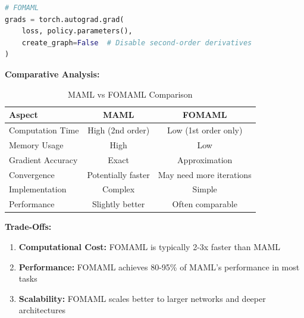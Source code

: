 \documentclass[12pt]{article}
\begin{document}
{{\begin{lstlisting}[language=Python]
# FOMAML
grads = torch.autograd.grad(
    loss, policy.parameters(),
    create_graph=False  # Disable second-order derivatives
)
\end{lstlisting}
			
			\textbf{Comparative Analysis:}
			
			\begin{table}[H]
			\centering
			\caption{MAML vs FOMAML Comparison}
			\begin{tabular}{|l|c|c|}
			\hline
			\textbf{Aspect} & \textbf{MAML} & \textbf{FOMAML} \\
			\hline
			Computation Time & High (2nd order) & Low (1st order only) \\
			\hline
			Memory Usage & High & Low \\
			\hline
			Gradient Accuracy & Exact & Approximation \\
			\hline
			Convergence & Potentially faster & May need more iterations \\
			\hline
			Implementation & Complex & Simple \\
			\hline
			Performance & Slightly better & Often comparable \\
			\hline
			\end{tabular}
			\end{table}
			
			\textbf{Trade-Offs:}
			
			\begin{enumerate}
				\item \textbf{Computational Cost:} FOMAML is typically 2-3x faster than MAML
				\item \textbf{Performance:} FOMAML achieves 80-95\% of MAML's performance in most tasks
				\item \textbf{Scalability:} FOMAML scales better to larger networks and deeper architectures
			\end{enumerate}
			
	}}
	
	
	\newpage
	
\end{document}
